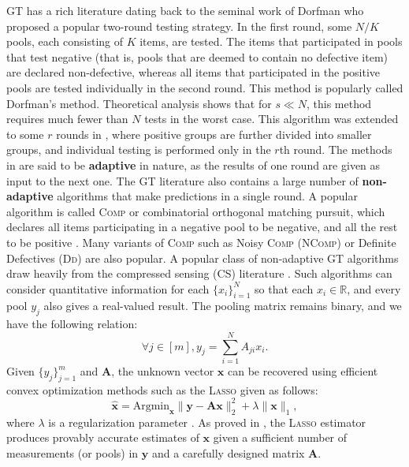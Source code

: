 \documentclass[sigconf, anonymous, review]{acmart}
\begin{document}
GT has a rich literature dating back to the seminal work of Dorfman \cite{Dorfman1943} who proposed a popular two-round testing strategy. In the first round, some $N/K$ pools, each consisting of $K$ items, are tested. The items that participated in pools that test negative (that is, pools that are deemed to contain no defective item) are declared non-defective, whereas all items that participated in the positive pools are tested individually in the second round. This method is popularly called Dorfman's method. Theoretical analysis shows that for $s \ll N$, this method requires much fewer than $N$ tests in the worst case. This algorithm was extended to some $r$ rounds in \cite{Li1962}, where positive groups are further divided into smaller groups, and individual testing is performed only in the $r$th round. The methods in \cite{Dorfman1943, Li1962} are said to be \textbf{adaptive} in nature, as the results of one round are given as input to the next one. The GT literature also contains a large number of \textbf{non-adaptive} algorithms that make predictions in a single round.  A popular algorithm is called \textsc{Comp} or combinatorial orthogonal matching pursuit, which declares all items participating in a negative pool to be negative, and all the rest to be positive \cite{Aldridge2019}. Many variants of \textsc{Comp} such as Noisy \textsc{Comp} (\textsc{NComp}) or Definite Defectives (\textsc{Dd}) are also popular. A popular class of non-adaptive GT algorithms draw heavily from the compressed sensing (CS) literature \cite{Candes2008}. Such algorithms can consider quantitative information for each $\{x_i\}_{i=1}^N$ so that each $x_i \in \mathbb{R}$, and every pool $y_j$ also gives a real-valued result. The pooling matrix remains binary, and we have the following relation:
\begin{equation}
\forall j \in [m], y_j  = \sum_{i=1}^N A_{ji} x_i. 
\end{equation}
Given $\{y_j\}_{j=1}^m$ and $\boldsymbol{A}$, the unknown vector $\boldsymbol{x}$ can be recovered using efficient convex optimization methods such as the \textsc{Lasso} given as follows: 
\begin{equation}
\boldsymbol{\hat{x}} = \textrm{Argmin}_{\boldsymbol{x}} \|\boldsymbol{y}-\boldsymbol{Ax}\|^2_2 + \lambda \|\boldsymbol{x}\|_1, 
\end{equation}
where $\lambda$ is a regularization parameter \cite{Hastie2015}. As proved in \cite{Hastie2015, Davenport2012}, the \textsc{Lasso} estimator produces provably accurate estimates of $\boldsymbol{x}$ given a sufficient number of measurements (or pools) in $\boldsymbol{y}$ and a carefully designed matrix $\boldsymbol{A}$. 
\end{document}
